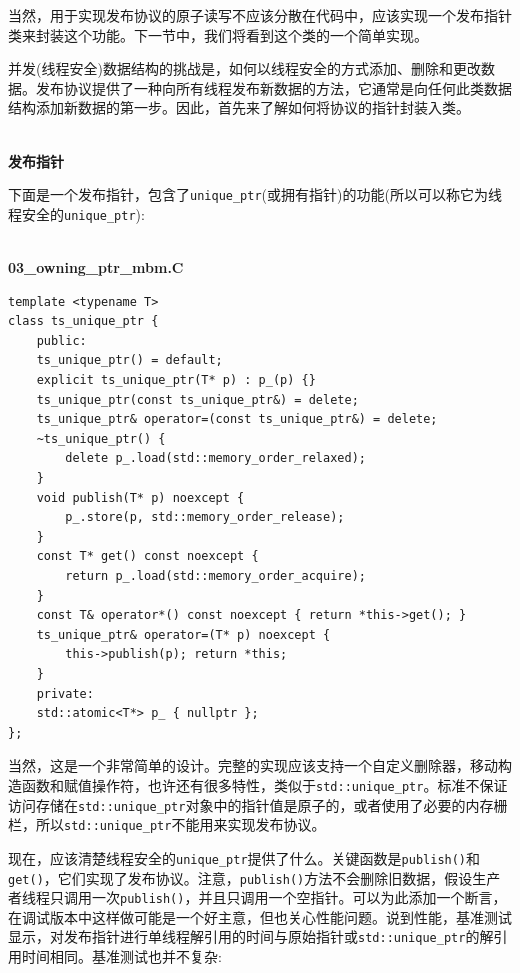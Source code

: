当然，用于实现发布协议的原子读写不应该分散在代码中，应该实现一个发布指针类来封装这个功能。下一节中，我们将看到这个类的一个简单实现。


并发(线程安全)数据结构的挑战是，如何以线程安全的方式添加、删除和更改数据。发布协议提供了一种向所有线程发布新数据的方法，它通常是向任何此类数据结构添加新数据的第一步。因此，首先来了解如何将协议的指针封装入类。

\hspace*{\fill} \\ %
\noindent
\textbf{发布指针}

下面是一个发布指针，包含了\texttt{unique\_ptr}(或拥有指针)的功能(所以可以称它为线程安全的\texttt{unique\_ptr}):

\hspace*{\fill} \\ %
\noindent
\textbf{03\_owning\_ptr\_mbm.C}
\begin{lstlisting}[style=styleCXX]
template <typename T>
class ts_unique_ptr {
	public:
	ts_unique_ptr() = default;
	explicit ts_unique_ptr(T* p) : p_(p) {}
	ts_unique_ptr(const ts_unique_ptr&) = delete;
	ts_unique_ptr& operator=(const ts_unique_ptr&) = delete;
	~ts_unique_ptr() {
		delete p_.load(std::memory_order_relaxed);
	}
	void publish(T* p) noexcept {
		p_.store(p, std::memory_order_release);
	}
	const T* get() const noexcept {
		return p_.load(std::memory_order_acquire);
	}
	const T& operator*() const noexcept { return *this->get(); }
	ts_unique_ptr& operator=(T* p) noexcept {
		this->publish(p); return *this;
	}
	private:
	std::atomic<T*> p_ { nullptr };
};
\end{lstlisting}

当然，这是一个非常简单的设计。完整的实现应该支持一个自定义删除器，移动构造函数和赋值操作符，也许还有很多特性，类似于\texttt{std::unique\_ptr}。标准不保证访问存储在\texttt{std::unique\_ptr}对象中的指针值是原子的，或者使用了必要的内存栅栏，所以\texttt{std::unique\_ptr}不能用来实现发布协议。

现在，应该清楚线程安全的\texttt{unique\_ptr}提供了什么。关键函数是\texttt{publish()}和\texttt{get()}，它们实现了发布协议。注意，\texttt{publish()}方法不会删除旧数据，假设生产者线程只调用一次\texttt{publish()}，并且只调用一个空指针。可以为此添加一个断言，在调试版本中这样做可能是一个好主意，但也关心性能问题。说到性能，基准测试显示，对发布指针进行单线程解引用的时间与原始指针或\texttt{std::unique\_ptr}的解引用时间相同。基准测试也并不复杂:

